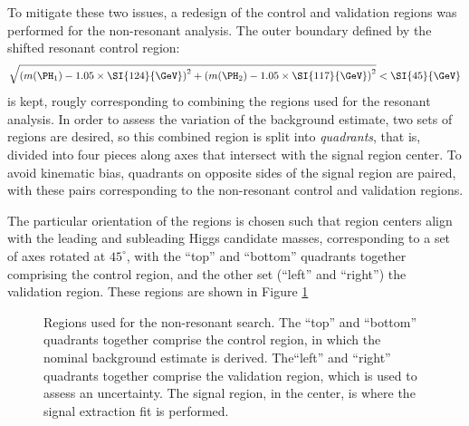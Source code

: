 To mitigate these two issues, a redesign of the control and validation regions was performed for 
the non-resonant analysis. The outer boundary defined by the shifted resonant control region:
\begin{equation}
	\label{eqn:ctrl-reg-def}
	\sqrt{\qty(\mh1 - 1.05 \times \SI{124}{\GeV})^{2} + \qty(\mh2 - 1.05 \times
		\SI{117}{\GeV})^{2}} < \SI{45}{\GeV}
\end{equation}
is kept, rougly corresponding to combining the regions used for the resonant analysis. In order 
to assess the variation of the background estimate, two sets of regions are desired, so this combined 
region is split into \emph{quadrants}, that is, divided into four pieces along axes that intersect 
with the signal region center. To avoid kinematic bias, quadrants on opposite sides of the signal 
region are paired, with these pairs corresponding to the non-resonant control and validation regions.

The particular orientation of the regions is chosen such that region centers align with the leading
and subleading Higgs candidate masses, corresponding to a set of axes rotated at $45^{\circ}$, with the ``top''
and ``bottom'' quadrants together comprising the control region, and the other set (``left'' and ``right'')
the validation region. These regions are shown in Figure \ref{fig:nonres-regions}
\begin{figure}
\centering
{}
\caption{\label{fig:nonres-regions} Regions used for the non-resonant search. The ``top''
and ``bottom'' quadrants together comprise the control region, in which the nominal background 
estimate is derived. The``left'' and ``right'' quadrants together comprise the validation region, 
which is used to assess an uncertainty. The signal region, in the center, is where the signal extraction 
fit is performed.}
\end{figure}

